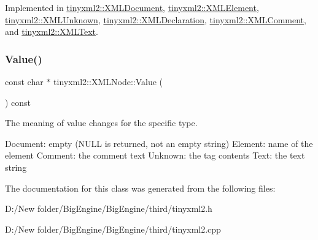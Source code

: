 Implemented in \mbox{\hyperlink{classtinyxml2_1_1_x_m_l_document_a6fe5ef18699091844fcf64b56ffa5bf9}{tinyxml2\+::\+X\+M\+L\+Document}}, \mbox{\hyperlink{classtinyxml2_1_1_x_m_l_element_a61ffd7bf918a9db4aa6203d855ac5ec2}{tinyxml2\+::\+X\+M\+L\+Element}}, \mbox{\hyperlink{classtinyxml2_1_1_x_m_l_unknown_ac46767cd721d666e690a6231dfb618d1}{tinyxml2\+::\+X\+M\+L\+Unknown}}, \mbox{\hyperlink{classtinyxml2_1_1_x_m_l_declaration_ae8b4d3a399857029f36c322b0801b69c}{tinyxml2\+::\+X\+M\+L\+Declaration}}, \mbox{\hyperlink{classtinyxml2_1_1_x_m_l_comment_a965d880a99d58dd915caa88dc37a9b51}{tinyxml2\+::\+X\+M\+L\+Comment}}, and \mbox{\hyperlink{classtinyxml2_1_1_x_m_l_text_a99d8bce4dc01df889126e047f358cdfc}{tinyxml2\+::\+X\+M\+L\+Text}}.

\mbox{\label{classtinyxml2_1_1_x_m_l_node_a0485e51c670e741884cfd8362274d680}} 
\subsubsection{\texorpdfstring{Value()}{Value()}}
{\footnotesize\ttfamily const char $\ast$ tinyxml2\+::\+X\+M\+L\+Node\+::\+Value (\begin{DoxyParamCaption}{ }\end{DoxyParamCaption}) const}

The meaning of \textquotesingle{}value\textquotesingle{} changes for the specific type. \begin{DoxyVerb}Document:   empty (NULL is returned, not an empty string)
Element:    name of the element
Comment:    the comment text
Unknown:    the tag contents
Text:       the text string
\end{DoxyVerb}
 

The documentation for this class was generated from the following files\+:\begin{DoxyCompactItemize}
\item 
D\+:/\+New folder/\+Big\+Engine/\+Big\+Engine/third/tinyxml2.\+h\item 
D\+:/\+New folder/\+Big\+Engine/\+Big\+Engine/third/tinyxml2.\+cpp\end{DoxyCompactItemize}
